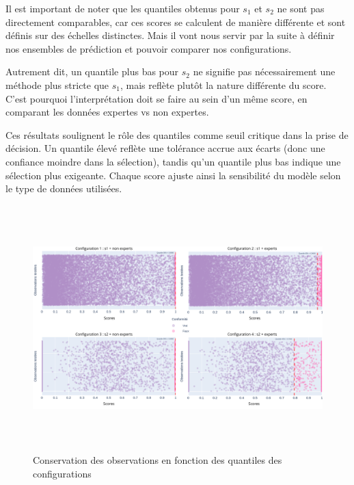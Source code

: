 \documentclass[a4paper,12pt]{article}
\begin{document}
\vspace{0.2cm}

Il est important de noter que les quantiles obtenus pour $s_1$ et $s_2$ ne sont pas directement comparables, car ces scores se calculent de manière différente et sont définis sur des échelles distinctes. Mais il vont nous servir par la suite à définir nos ensembles de prédiction et pouvoir comparer nos configurations.

\vspace{0.2cm}

Autrement dit, un quantile plus bas pour $s_2$ ne signifie pas nécessairement une méthode plus stricte que $s_1$, mais reflète plutôt la nature différente du score. C’est pourquoi l’interprétation doit se faire au sein d’un même score, en comparant les données expertes vs non expertes.

\vspace{0.2cm}

Ces résultats soulignent le rôle des quantiles comme seuil critique dans la prise de décision. Un quantile élevé reflète une tolérance accrue aux écarts (donc une confiance moindre dans la sélection), tandis qu’un quantile plus bas indique une sélection plus exigeante. Chaque score ajuste ainsi la sensibilité du modèle selon le type de données utilisées.

\begin{figure}[H]
    \centering
        \includegraphics[height = 9.5cm]{images/quantiles.png}
    \caption{Conservation des observations en fonction des quantiles des configurations}
    \label{fig:quantiles}
\end{figure}
\end{document}
